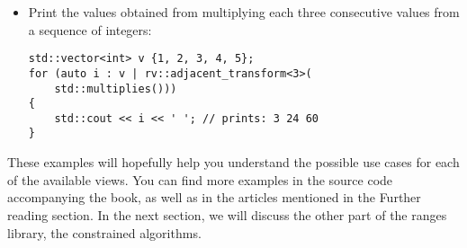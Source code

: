 \begin{itemize}
\item
Print the values obtained from multiplying each three consecutive values from a sequence of integers:

\begin{lstlisting}[style=styleCXX]
std::vector<int> v {1, 2, 3, 4, 5};
for (auto i : v | rv::adjacent_transform<3>(
	std::multiplies()))
{
	std::cout << i << ' '; // prints: 3 24 60
}
\end{lstlisting}

\end{itemize}

These examples will hopefully help you understand the possible use cases for each of the available views. You can find more examples in the source code accompanying the book, as well as in the articles mentioned in the Further reading section. In the next section, we will discuss the other part of the ranges library, the constrained algorithms.












